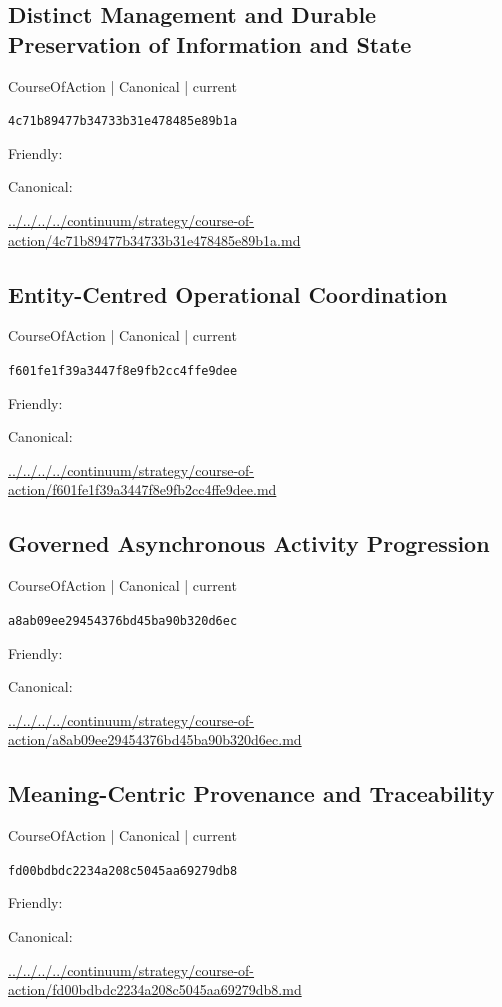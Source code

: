 \documentclass[10pt,a4paper]{article}
\begin{document}
\subsection*{Distinct Management and Durable Preservation of Information and State}
{\small CourseOfAction | Canonical | current}\par
\texttt{4c71b89477b34733b31e478485e89b1a}\par
Friendly: \par
Canonical: \par
{\footnotesize\url{../../../../continuum/strategy/course-of-action/4c71b89477b34733b31e478485e89b1a.md}}\par
\subsection*{Entity-Centred Operational Coordination}
{\small CourseOfAction | Canonical | current}\par
\texttt{f601fe1f39a3447f8e9fb2cc4ffe9dee}\par
Friendly: \par
Canonical: \par
{\footnotesize\url{../../../../continuum/strategy/course-of-action/f601fe1f39a3447f8e9fb2cc4ffe9dee.md}}\par
\subsection*{Governed Asynchronous Activity Progression}
{\small CourseOfAction | Canonical | current}\par
\texttt{a8ab09ee29454376bd45ba90b320d6ec}\par
Friendly: \par
Canonical: \par
{\footnotesize\url{../../../../continuum/strategy/course-of-action/a8ab09ee29454376bd45ba90b320d6ec.md}}\par
\subsection*{Meaning-Centric Provenance and Traceability}
{\small CourseOfAction | Canonical | current}\par
\texttt{fd00bdbdc2234a208c5045aa69279db8}\par
Friendly: \par
Canonical: \par
{\footnotesize\url{../../../../continuum/strategy/course-of-action/fd00bdbdc2234a208c5045aa69279db8.md}}\par
\end{document}
